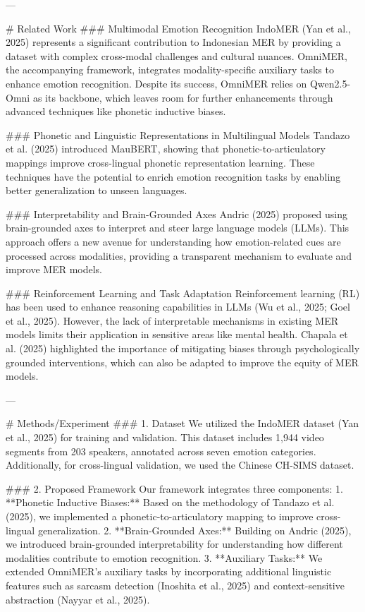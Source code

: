 ---

# Related Work  
### Multimodal Emotion Recognition  
IndoMER (Yan et al., 2025) represents a significant contribution to Indonesian MER by providing a dataset with complex cross-modal challenges and cultural nuances. OmniMER, the accompanying framework, integrates modality-specific auxiliary tasks to enhance emotion recognition. Despite its success, OmniMER relies on Qwen2.5-Omni as its backbone, which leaves room for further enhancements through advanced techniques like phonetic inductive biases.  

### Phonetic and Linguistic Representations in Multilingual Models  
Tandazo et al. (2025) introduced MauBERT, showing that phonetic-to-articulatory mappings improve cross-lingual phonetic representation learning. These techniques have the potential to enrich emotion recognition tasks by enabling better generalization to unseen languages.  

### Interpretability and Brain-Grounded Axes  
Andric (2025) proposed using brain-grounded axes to interpret and steer large language models (LLMs). This approach offers a new avenue for understanding how emotion-related cues are processed across modalities, providing a transparent mechanism to evaluate and improve MER models.  

### Reinforcement Learning and Task Adaptation  
Reinforcement learning (RL) has been used to enhance reasoning capabilities in LLMs (Wu et al., 2025; Goel et al., 2025). However, the lack of interpretable mechanisms in existing MER models limits their application in sensitive areas like mental health. Chapala et al. (2025) highlighted the importance of mitigating biases through psychologically grounded interventions, which can also be adapted to improve the equity of MER models.  

---

# Methods/Experiment  
### 1. Dataset  
We utilized the IndoMER dataset (Yan et al., 2025) for training and validation. This dataset includes 1,944 video segments from 203 speakers, annotated across seven emotion categories. Additionally, for cross-lingual validation, we used the Chinese CH-SIMS dataset.  

### 2. Proposed Framework  
Our framework integrates three components:  
1. **Phonetic Inductive Biases:** Based on the methodology of Tandazo et al. (2025), we implemented a phonetic-to-articulatory mapping to improve cross-lingual generalization.  
2. **Brain-Grounded Axes:** Building on Andric (2025), we introduced brain-grounded interpretability for understanding how different modalities contribute to emotion recognition.  
3. **Auxiliary Tasks:** We extended OmniMER's auxiliary tasks by incorporating additional linguistic features such as sarcasm detection (Inoshita et al., 2025) and context-sensitive abstraction (Nayyar et al., 2025).  

